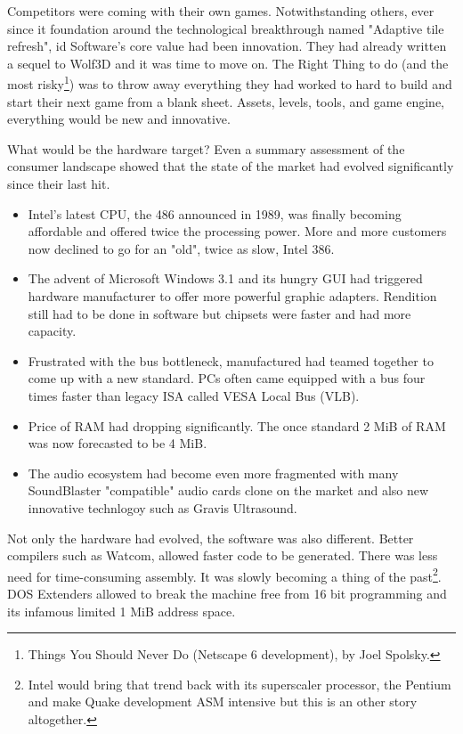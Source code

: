 Competitors were coming with their own games. Notwithstanding others, ever since it foundation around the technological breakthrough named "Adaptive tile refresh", id Software's core value had been innovation. They had already written a sequel to Wolf3D and it was time to move on. The Right Thing to do (and the most risky\footnote{Things You Should Never Do (Netscape 6 development), by Joel Spolsky.}) was to throw away everything they had worked to hard to build and start their next game from a blank sheet. Assets, levels, tools, and game engine, everything would be new and innovative.\\
\par
What would be the hardware target? Even a summary assessment of the consumer landscape showed that the state of the market had evolved significantly since their last hit.\\
\begin{itemize}
\item Intel's latest CPU, the 486 announced in 1989, was finally becoming affordable and offered twice the processing power. More and more customers now declined to go for an "old", twice as slow, Intel 386. 
\item The advent of Microsoft Windows 3.1 and its hungry GUI had triggered hardware manufacturer to offer more powerful graphic adapters. Rendition still had to be done in software but chipsets were faster and had more capacity.
\item Frustrated with the bus bottleneck, manufactured had teamed together to come up with a new standard. PCs often came equipped with a bus four times faster than legacy ISA called VESA Local Bus (VLB). 
\item Price of RAM had dropping significantly. The once standard 2 MiB of RAM was now forecasted to be 4 MiB. 
\item The audio ecosystem had become even more fragmented with many SoundBlaster "compatible" audio cards clone on the market and also new innovative technlogoy such as Gravis Ultrasound.\\
\end{itemize}
 \par 
 Not only the hardware had evolved, the software was also different. Better compilers such as Watcom, allowed faster code to be generated. There was less need for time-consuming assembly. It was slowly becoming a thing of the past\footnote{Intel would bring that trend back with its superscaler processor, the Pentium and make Quake development ASM intensive but this is an other story altogether.}. DOS Extenders allowed to break the machine free from 16 bit programming and its infamous limited 1 MiB address space.\\
